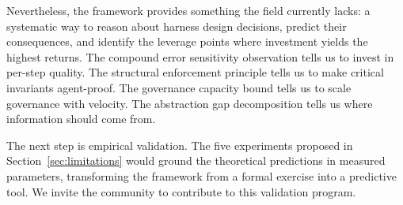 \documentclass[11pt, a4paper]{googledeepmind}
\begin{document}
Nevertheless, the framework provides something the field currently lacks: a systematic way to reason about harness design decisions, predict their consequences, and identify the leverage points where investment yields the highest returns. The compound error sensitivity observation tells us to invest in per-step quality. The structural enforcement principle tells us to make critical invariants agent-proof. The governance capacity bound tells us to scale governance with velocity. The abstraction gap decomposition tells us where information should come from.

The next step is empirical validation. The five experiments proposed in Section~\ref{sec:limitations} would ground the theoretical predictions in measured parameters, transforming the framework from a formal exercise into a predictive tool. We invite the community to contribute to this validation program.
\end{document}

